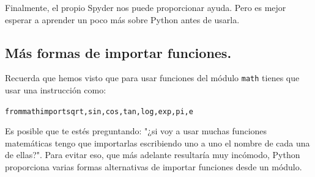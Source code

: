 \documentclass[10pt,a4paper]{article}\usepackage[]{graphicx}\usepackage[]{color}
\makeatletter
\newenvironment{kframe}{%
 \def\at@end@of@kframe{}%
 \ifinner\ifhmode%
  \def\at@end@of@kframe{\end{minipage}}%
  \begin{minipage}{\columnwidth}%
 \fi\fi%
 \def\FrameCommand##1{\hskip\@totalleftmargin \hskip-\fboxsep
 \colorbox{shadecolor}{##1}\hskip-\fboxsep
     \hskip-\linewidth \hskip-\@totalleftmargin \hskip\columnwidth}%
 \MakeFramed {\advance\hsize-\width
   \@totalleftmargin\z@ \linewidth\hsize
   \@setminipage}}%
 {\par\unskip\endMakeFramed%
 \at@end@of@kframe}
\newenvironment{knitrout}{}{} %
\makeatother
\begin{document}
Finalmente, el propio Spyder nos puede proporcionar ayuda. Pero es mejor esperar a aprender un poco más sobre Python antes de usarla.

\subsection{Más formas de importar funciones.}
\label{tut02:subsec:MasFormasImportarFunciones}

Recuerda que hemos visto que para usar funciones del módulo {\tt math} tienes que usar una instrucción como:
\begin{knitrout}
\color{fgcolor}\begin{kframe}
\begin{alltt}
from math import sqrt, sin, cos, tan, log, exp, pi, e
\end{alltt}
\end{kframe}
\end{knitrout}

Es posible que te estés preguntando: "¿si voy a usar muchas funciones matemáticas tengo que importarlas escribiendo uno a uno el nombre de cada una de ellas?". Para evitar eso, que más adelante resultaría muy incómodo, Python proporciona varias formas alternativas de importar funciones desde un módulo.
\end{document}
